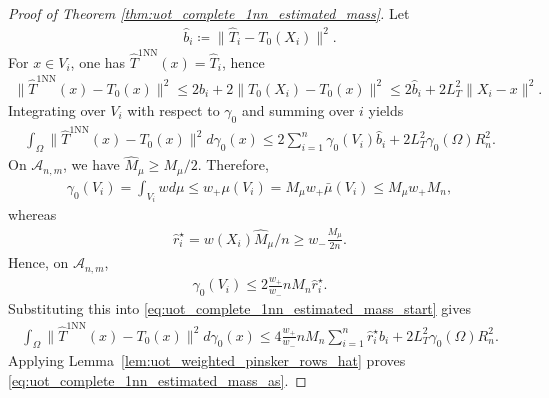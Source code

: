 \documentclass[11pt,reqno]{amsart}
\theoremstyle{definition}
\renewcommand{\hat}{\widehat}
\begin{document}
\begin{proof}[Proof of Theorem \ref{thm:uot_complete_1nn_estimated_mass}]
Let
\begin{align}
    \hat b_i \coloneqq \|\hat T_i-T_0(X_i)\|^2.
\end{align}
For $x\in V_i$, one has $\hat T^{\mathrm{1NN}}(x)=\hat T_i$, hence
\begin{align}
    \|\hat T^{\mathrm{1NN}}(x)-T_0(x)\|^2
    \le
    2\hat b_i + 2\|T_0(X_i)-T_0(x)\|^2
    \le
    2\hat b_i + 2L_T^2\|X_i-x\|^2.
\end{align}
Integrating over $V_i$ with respect to $\gamma_0$ and summing over $i$ yields
\begin{align}
\label{eq:uot_complete_1nn_estimated_mass_start}
    \int_\Omega \|\hat T^{\mathrm{1NN}}(x)-T_0(x)\|^2  d\gamma_0(x)
    \le
    2\sum_{i=1}^n \gamma_0(V_i)\hat b_i
    + 2L_T^2\gamma_0(\Omega)R_n^2.
\end{align}
On $\mathcal{A}_{n,m}$, we have $\hat M_\mu\ge M_\mu/2$.
Therefore,
\begin{align}
    \gamma_0(V_i)
    = \int_{V_i} w  d\mu
    \le
    w_+ \mu(V_i)
    = M_\mu w_+\bar\mu(V_i)
    \le
    M_\mu w_+ M_n,
\end{align}
whereas
\begin{align}
    \hat r_i^\star = w(X_i){\hat M_\mu/n}
    \ge
    w_-\frac{M_\mu}{2n}.
\end{align}
Hence, on $\mathcal{A}_{n,m}$,
\begin{align}
    \gamma_0(V_i)
    \le
    2\frac{w_+}{w_-}  nM_n \hat r_i^\star.
\end{align}
Substituting this into \eqref{eq:uot_complete_1nn_estimated_mass_start} gives
\begin{align}
    \int_\Omega \|\hat T^{\mathrm{1NN}}(x)-T_0(x)\|^2  d\gamma_0(x)
    \le
    4\frac{w_+}{w_-}  nM_n \sum_{i=1}^n \hat r_i^\star\hat b_i
    + 2L_T^2\gamma_0(\Omega)R_n^2.
\end{align}
Applying Lemma~\ref{lem:uot_weighted_pinsker_rows_hat} proves
\eqref{eq:uot_complete_1nn_estimated_mass_as}.


\end{proof}
\end{document}
